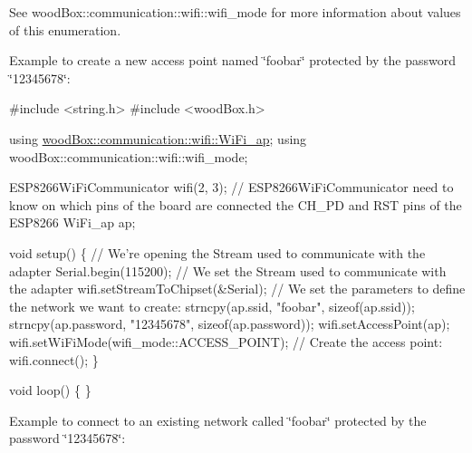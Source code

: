 See wood\+Box\+::communication\+::wifi\+::wifi\+\_\+mode for more information about values of this enumeration.

Example to create a new access point named \char`\"{}foobar\char`\"{} protected by the password \char`\"{}12345678\char`\"{}\+:


\begin{DoxyCode}
\textcolor{preprocessor}{#include <string.h>}
\textcolor{preprocessor}{#include <woodBox.h>}

\textcolor{keyword}{using} \mbox{\hyperlink{structwood_box_1_1communication_1_1wifi_1_1s__wifi__access__point}{woodBox::communication::wifi::WiFi\_ap}};
\textcolor{keyword}{using} woodBox::communication::wifi::wifi\_mode;

ESP8266WiFiCommunicator wifi(2, 3); \textcolor{comment}{// ESP8266WiFiCommunicator need to know on which pins of the board are
       connected the CH\_PD and RST pins of the ESP8266}
WiFi\_ap ap;

\textcolor{keywordtype}{void} setup() \{
  \textcolor{comment}{// We're opening the Stream used to communicate with the adapter}
  Serial.begin(115200);
  \textcolor{comment}{// We set the Stream used to communicate with the adapter}
  wifi.setStreamToChipset(&Serial);
  \textcolor{comment}{// We set the parameters to define the network we want to create:}
  strncpy(ap.ssid, \textcolor{stringliteral}{"foobar"}, \textcolor{keyword}{sizeof}(ap.ssid));
  strncpy(ap.password, \textcolor{stringliteral}{"12345678"}, \textcolor{keyword}{sizeof}(ap.password));
  wifi.setAccessPoint(ap);
  wifi.setWiFiMode(wifi\_mode::ACCESS\_POINT);
  \textcolor{comment}{// Create the access point:}
  wifi.connect();
\}

\textcolor{keywordtype}{void} loop() \{
\}
\end{DoxyCode}


Example to connect to an existing network called \char`\"{}foobar\char`\"{} protected by the password \char`\"{}12345678\char`\"{}\+:


